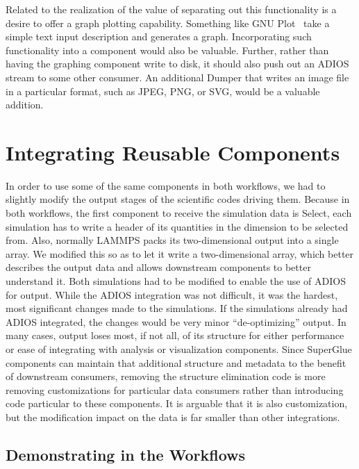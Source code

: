 \documentclass[conference]{IEEEtran}
\begin{document}
Related to the realization of the value of separating out this functionality is
a desire to offer a graph plotting capability. Something like GNU
Plot~\cite{racine:2006:gnuplot} take a simple text input description and
generates a graph.  Incorporating such functionality into a component would
also be valuable.  Further, rather than having the graphing component write to
disk, it should also push out an ADIOS stream to some other consumer. An
additional Dumper that writes an image file in a particular format, such as
JPEG, PNG, or SVG, would be a valuable addition.

\section{Integrating Reusable Components}
\label{s:integrating-reusable-components}



In order to use some of the same components in both workflows, we had to
slightly modify the output stages of the scientific codes driving them. Because
in both workflows, the first component to receive the simulation data is
Select, each simulation has to write a header of its quantities in the
dimension to be selected from. Also, normally LAMMPS packs its two-dimensional
output into a single array. We modified this so as to let it write a
two-dimensional array, which better describes the output data and allows
downstream components to better understand it. Both simulations had to be
modified to enable the use of ADIOS for output. While the ADIOS integration was
not difficult, it was the hardest, most significant changes made to the
simulations. If the simulations already had ADIOS integrated, the changes would
be very minor ``de-optimizing'' output. In many cases, output loses most, if
not all, of its structure for either performance or ease of integrating with
analysis or visualization components. Since SuperGlue components can maintain
that additional structure and metadata to the benefit of downstream consumers,
removing the structure elimination code is more removing customizations for
particular data consumers rather than introducing code particular to these
components. It is arguable that it is also customization, but the modification
impact on the data is far smaller than other integrations.

\subsection{Demonstrating in the Workflows}
\end{document}
